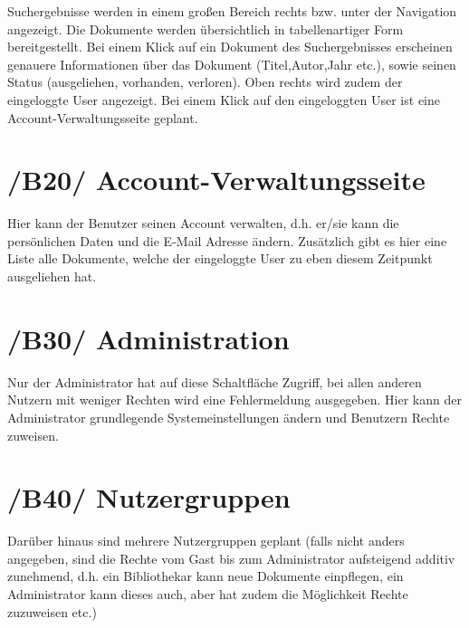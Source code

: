 Suchergebnisse werden in einem großen Bereich rechts bzw. unter der Navigation angezeigt. Die Dokumente werden übersichtlich in tabellenartiger Form bereitgestellt. Bei einem Klick auf ein Dokument des Suchergebnisses erscheinen genauere Informationen über das Dokument (Titel,Autor,Jahr etc.), sowie
seinen Status (ausgeliehen, vorhanden, verloren).
Oben rechts wird zudem der eingeloggte User angezeigt.
Bei einem Klick auf den eingeloggten User ist eine Account-Verwaltungsseite geplant.



\section{/B20/ Account-Verwaltungsseite}
  	 	
Hier kann der Benutzer seinen Account verwalten, d.h. er/sie kann die persönlichen Daten und die E-Mail Adresse ändern.
Zusätzlich gibt es hier eine Liste alle Dokumente, welche der eingeloggte User zu eben diesem Zeitpunkt ausgeliehen hat.



\section{/B30/ Administration}

Nur der Administrator hat auf diese Schaltfläche Zugriff, bei allen anderen Nutzern mit weniger Rechten wird eine Fehlermeldung ausgegeben.
Hier kann der Administrator grundlegende Systemeinstellungen ändern und Benutzern Rechte zuweisen.



\section{/B40/ Nutzergruppen}

Darüber hinaus sind mehrere Nutzergruppen geplant (falls nicht anders angegeben, sind die Rechte vom Gast bis zum Administrator aufsteigend additiv zunehmend, d.h. ein Bibliothekar kann neue Dokumente einpflegen, ein Administrator kann dieses auch, aber hat zudem die Möglichkeit Rechte zuzuweisen etc.) 

